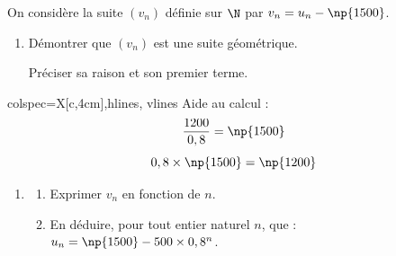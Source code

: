 \begin{minipage}{11cm}
	On considère la suite $\left(v_{n}\right)$ définie sur $\N$ par \quad $v_{n}=u_{n}-\np{1500}$.

\begin{enumerate}
	\item Démontrer que $\left(v_{n}\right)$ est une suite géométrique.

	Préciser sa raison et son premier terme.
\end{enumerate}
\end{minipage}
\hfill
\begin{tblr}{colspec={X[c,4cm]},hlines, vlines}
	Aide au calcul :
	\[\dfrac{1200}{0,8}=\np{1500}\]
	\[0,8 \times \np{1500}=\np{1200}\]
\end{tblr}

\begin{enumerate}[start=2]
	\item \begin{enumerate}
		\item Exprimer $v_{n}$ en fonction de $n$.

		\item En déduire, pour tout entier naturel $n$, que : \quad $u_{n}=\np{1500}-500 \times 0,8^{n}$.
	\end{enumerate}
\end{enumerate}
